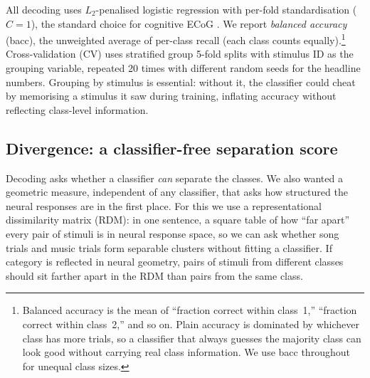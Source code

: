 \documentclass[11pt]{article}
\begin{document}
All decoding uses $L_2$-penalised logistic regression with per-fold standardisation ($C = 1$), the standard choice for cognitive ECoG \citep{Holdgraf2017}. We report \emph{balanced accuracy} (bacc), the unweighted average of per-class recall (each class counts equally).\footnote{Balanced accuracy is the mean of ``fraction correct within class~1,'' ``fraction correct within class~2,'' and so on. Plain accuracy is dominated by whichever class has more trials, so a classifier that always guesses the majority class can look good without carrying real class information. We use bacc throughout for unequal class sizes.} Cross-validation (CV) uses stratified group 5-fold splits with stimulus ID as the grouping variable, repeated 20 times with different random seeds for the headline numbers. Grouping by stimulus is essential: without it, the classifier could cheat by memorising a stimulus it saw during training, inflating accuracy without reflecting class-level information.

\subsection{Divergence: a classifier-free separation score}\label{sec:methods:divergence}
Decoding asks whether a classifier \emph{can} separate the classes. We also wanted a geometric measure, independent of any classifier, that asks how structured the neural responses are in the first place. For this we use a representational dissimilarity matrix (RDM): in one sentence, a square table of how ``far apart'' every pair of stimuli is in neural response space, so we can ask whether song trials and music trials form separable clusters without fitting a classifier. If category is reflected in neural geometry, pairs of stimuli from different classes should sit farther apart in the RDM than pairs from the same class.
\end{document}
